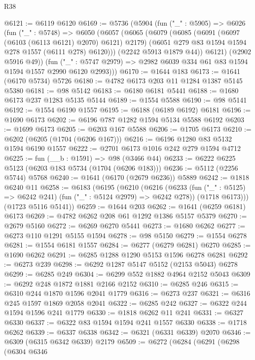 \begin{lexlean}{R38}
\begin{coremodule}
@6121 := @6119 @6120
@6169 := @5736
    (@5904
      (fun ("_" : @5905) =>
      @6026
        (fun ("_" : @5748) =>
        @6050
          (@6057
            (@6065
              (@6079
                (@6085
                  (@6091 (@6097 (@6103 (@6113 @6121) @2070) @6121) @2179)
                  (@6051 @279 @83 @1594 @1594 @278 @1557 (@6111 @278) @6120)))
              (@2242 @5913 @1879 @44))
            @6121)
          (@2902 @5916 @49))
        (fun ("_" : @5747 @2979) => @2982 @6039 @334 @61 @83 @1594 @1594 @1557 @2990 @6120 @2993)))
@6170 := @1644 @183
@6173 := @1641 (@6170 @5734) @5726
@6180 := @4782 @6173 @203 @11 @1284 @1387 @5145 @5380
@6181 := @98 @5142
@6183 := @6180 @6181 @5441
@6188 := @1680 @6173 @237 @1283 @5135 @5144
@6189 := @1554 @5588
@6190 := @98 @5141
@6192 := @1554 @6190 @1557
@6195 := @6188 (@6189 @6192) @6181
@6196 := @1690 @6173
@6202 := @6196 @787 @1282 @1594 @5134 @5588 @6192
@6203 := @1699 @6173
@6205 := @6203 @167 @5588
@6206 := @1705 @6173
@6210 := @6202 (@6205 (@1704 (@6206 @167)))
@6216 := @6196 @1280 @83 @5132 @1594 @6190 @1557
@6222 := @2701 @6173 @1016 @242 @279 @1594 @4712
@6225 := fun (__b : @1591) => @98 (@3466 @44)
@6233 := @6222 @6225 @5123 (@6203 @183 @5734 (@1704 (@6206 @183)))
@6236 := @5112 (@2256 @5744) @5768
@6240 := @1641 (@6170 (@2679 @6236)) @5889
@6242 := @1818 @6240 @11
@6258 := @6183
    (@6195
      (@6210
        (@6216
          (@6233 (fun ("_" : @5125) => @6242 @241) (fun ("_" : @5124 @2979) => @6242 @278))
          (@1718 @6173)))
      (@1723 @5116 @5141))
@6259 := @1644 @203
@6262 := @1641 (@6259 @6181) @6173
@6269 := @4782 @6262 @208 @61 @1292 @1386 @5157 @5379
@6270 := @2679 @5160
@6272 := @6269 @6270 @5441
@6273 := @1680 @6262
@6277 := @6273 @110 @1291 @5155 @1594
@6278 := @98 @5150
@6279 := @1554 @6278
@6281 := @1554 @6181 @1557
@6284 := @6277 (@6279 @6281) @6270
@6285 := @1690 @6262
@6291 := @6285 @1288 @1290 @5153 @1596 @6278 @6281
@6292 := @6273 @239
@6298 := @6292 @1287 @5147 @5152 (@2153 @5043) @6278
@6299 := @6285 @249
@6304 := @6299 @552 @1882 @4964 @2152 @5043
@6309 := @6292 @248 @1872 @1881 @2166 @2152
@6310 := @6285 @246
@6315 := @6310 @244 @1870 @1596 @2041 @1779
@6316 := @6273 @237
@6321 := @6316 @245 @1597 @1869 @2058 @2041
@6322 := @6285 @242
@6327 := @6322 @244 @1594 @1596 @241 @1779
@6330 := @1818 @6262 @11 @241
@6331 := @6327 @6330
@6337 := @6322 @83 @1594 @1594 @241 @1557 @6330
@6338 := @1718 @6262
@6339 := @6337 @6338
@6342 := @6321 (@6331 @6339) @2070
@6346 := @6309 (@6315 @6342 @6339) @2179
@6509 := @6272
    (@6284
      (@6291
        (@6298
          (@6304
            @6346

\end{coremodule}
\end{lexlean}
